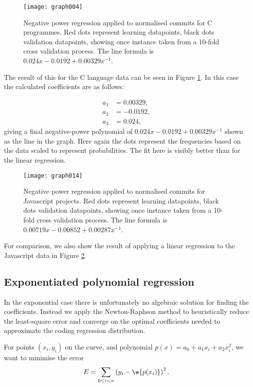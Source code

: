 \documentclass[10pt,journal,compsoc]{IEEEtran}
\begin{document}
\begin{figure}[t]
\centering
\texttt{[image: graph004]}%
\caption{\label{fig:c-negpow}Negative power regression applied to normalised commits for C programmes. Red dots represent learning datapoints, black dots validation datapoints, showing once instance taken from a 10-fold cross validation process. The line formula is $0.024x - 0.0192 + 0.00329x^{-1}$.}
\end{figure}

The result of this for the C language data can be seen in Figure \ref{fig:c-negpow}. In this case the calculated coefficients are as follows:

\begin{align*}
a_1 & = 0.00329, \\
a_2 & = -0.0192, \\
a_3 & = 0.024,
\end{align*}
giving a final negative-power polynomial of $0.024x - 0.0192 + 0.00329x^{-1}$ shown as the line in the graph. Here again the dots represent the frequencies based on the data scaled to represent probabilities. The fit here is visibly better than for the linear regression.

\begin{figure}[t]
\centering
\texttt{[image: graph014]}%
\caption{\label{fig:javascript-negpow}Negative power regression applied to normalised commits for Javascript projects. Red dots represent learning datapoints, black dots validation datapoints, showing once instance taken from a 10-fold cross validation process. The line formula is $0.00719x - 0.00852 + 0.00287x^{-1}$.}
\end{figure}

For comparison, we also show the result of applying a linear regression to the Javascript data in Figure \ref{fig:javascript-negpow}.

\subsection{Exponentiated polynomial regression}

In the exponential case there is unfortunately no algebraic solution for finding the coefficients. Instead we apply the Newton-Raphson method to heuristically reduce the least-square error and converge on the optimal coefficients needed to approximate the coding regression distribution.

For points $(x_i, y_i)$ on the curve, and polynomial $p(x) = a_0 + a_1 x_i + a_2 x_i^2$, we want to minimise the error
$$
E = \sum_{0 \le i < n} \left( y_i - \e{p(x_i)} \right)^2 .
$$
\end{document}
